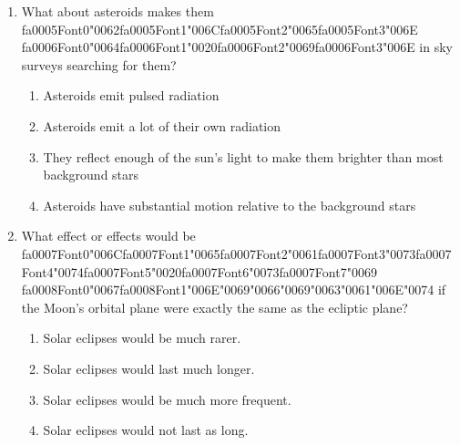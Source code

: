 \documentclass[12pt]{article}
\begin{document}
\begin{enumerate}[label=\arabic*.]
ALH84001?
\begin{enumerate}[label=(\alph*)]
    \item Complex organic molecules specifically PAHs
    \item Magnetite grains similar to those formed by bacteria on Earth
    \item Carbonate minerals indicating a thicker warmer Martian atmosphere
    \item Amino acids with a preferred orientation or "chirality"
\end{enumerate}
\item What about asteroids makes them {\csname fa0005Font0\endcsname\char"0062}{\csname fa0005Font1\endcsname\char"006C}{\csname fa0005Font2\endcsname\char"0065}{\csname fa0005Font3\endcsname\char"006E} {\csname fa0006Font0\endcsname\char"0064}{\csname fa0006Font1\endcsname\char"0020}{\csname fa0006Font2\endcsname\char"0069}{\csname fa0006Font3\endcsname\char"006E} in sky surveys searching for them?
\begin{enumerate}[label=(\alph*)]
    \item Asteroids emit pulsed radiation
    \item Asteroids emit a lot of their own radiation
    \item They reflect enough of the sun's light to make them brighter than most background stars
    \item Asteroids have substantial motion relative to the background stars
\end{enumerate}
\item What effect or effects would be {\csname fa0007Font0\endcsname\char"006C}{\csname fa0007Font1\endcsname\char"0065}{\csname fa0007Font2\endcsname\char"0061}{\csname fa0007Font3\endcsname\char"0073}{\csname fa0007Font4\endcsname\char"0074}{\csname fa0007Font5\endcsname\char"0020}{\csname fa0007Font6\endcsname\char"0073}{\csname fa0007Font7\endcsname\char"0069} {\csname fa0008Font0\endcsname\char"0067}{\csname fa0008Font1\endcsname\char"006E}{\char"0069}{\char"0066}{\char"0069}{\char"0063}{\char"0061}{\char"006E}{\char"0074} if the Moon's orbital plane were exactly
the same as the ecliptic plane?
\begin{enumerate}[label=(\alph*)]
    \item Solar eclipses would be much rarer.
    \item Solar eclipses would last much longer.
    \item Solar eclipses would be much more frequent.
    \item Solar eclipses would not last as long.
\end{enumerate}
\end{enumerate}
\end{document}
